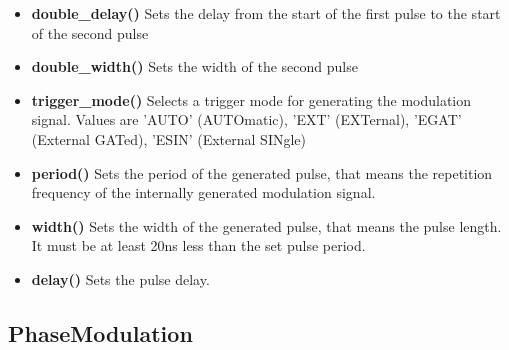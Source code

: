 \documentclass[11pt]{article} %
\begin{document}
\begin{itemize}
\item {\bf double\_delay()} Sets the delay from the start of the first pulse to the start of the second pulse
\item {\bf double\_width()} Sets the width of the second pulse
\item {\bf trigger\_mode()} Selects a trigger mode for generating the modulation signal. Values are 'AUTO' (AUTOmatic), 'EXT' (EXTernal), 'EGAT' (External GATed), 'ESIN' (External SINgle)
\item {\bf period()} Sets the period of the generated pulse, that means the repetition frequency of the internally generated modulation signal.
\item {\bf width()} Sets the width of the generated pulse, that means the pulse length. It must be at least 20ns less than the set pulse period.
\item {\bf delay()} Sets the pulse delay.
\end{itemize}


\subsection{PhaseModulation}
\end{document}
